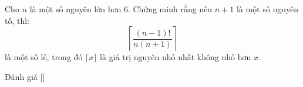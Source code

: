 \ifshowproblem
\begin{problem}\label{problem:THA-2015-MO-P5}
    Cho \( n \) là một số nguyên lớn hơn \( 6 \).  
    Chứng minh rằng nếu \( n+1 \) là một số nguyên tố, thì:
    \[
        \left\lceil \frac{(n-1)!}{n(n+1)} \right\rceil
    \]
    là một số lẻ, trong đó \( \lceil x \rceil \) là giá trị nguyên nhỏ nhất không nhỏ hơn \( x \).
\end{problem}
\fi

\ifshowinfo
Đánh giá [\textbf{}]\footnotemark
{}
\fi